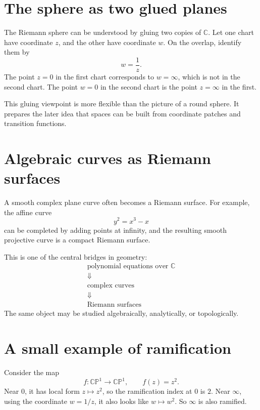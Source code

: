 
\section{The sphere as two glued planes}

The Riemann sphere can be understood by gluing two copies of \(\mathbb C\). Let one chart have coordinate \(z\), and the other have coordinate \(w\). On the overlap, identify them by
\[
  w=\frac1z.
\]
The point \(z=0\) in the first chart corresponds to \(w=\infty\), which is not in the second chart. The point \(w=0\) in the second chart is the point \(z=\infty\) in the first.

This gluing viewpoint is more flexible than the picture of a round sphere. It prepares the later idea that spaces can be built from coordinate patches and transition functions.

\section{Algebraic curves as Riemann surfaces}

A smooth complex plane curve often becomes a Riemann surface. For example, the affine curve
\[
  y^2=x^3-x
\]
can be completed by adding points at infinity, and the resulting smooth projective curve is a compact Riemann surface.

This is one of the central bridges in geometry:
\[
\begin{array}{c}
  \text{polynomial equations over }\mathbb C\\
  \Downarrow\\
  \text{complex curves}\\
  \Downarrow\\
  \text{Riemann surfaces}
\end{array}
\]
The same object may be studied algebraically, analytically, or topologically.

\section{A small example of ramification}

Consider the map
\[
  f:\mathbb{CP}^1\to\mathbb{CP}^1,\qquad f(z)=z^2.
\]
Near \(0\), it has local form \(z\mapsto z^2\), so the ramification index at \(0\) is \(2\). Near \(\infty\), using the coordinate \(w=1/z\), it also looks like \(w\mapsto w^2\). So \(\infty\) is also ramified.

